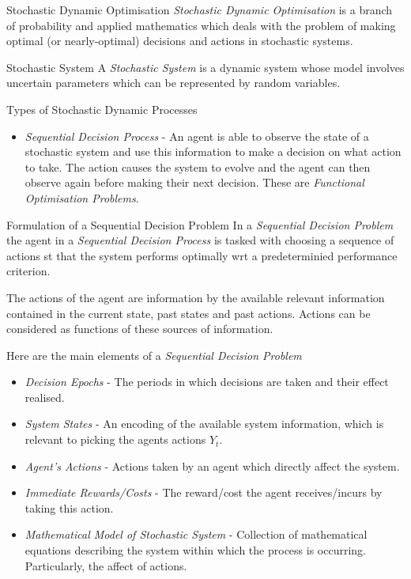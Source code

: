 \documentclass[11pt,a4paper]{article}
\begin{document}
  \begin{definition}{Stochastic Dynamic Optimisation}
    \textit{Stochastic Dynamic Optimisation} is a branch of probability and applied mathematics which deals with the problem of making optimal (or nearly-optimal) decisions and actions in stochastic systems.
  \end{definition}

  \begin{definition}{Stochastic System}
    A \textit{Stochastic System} is a dynamic system whose model involves uncertain parameters which can be represented by random variables.
  \end{definition}

  \begin{definition}{Types of Stochastic Dynamic Processes}
    \begin{itemize}
      \item \textit{Sequential Decision Process} - An agent is able to observe the state of a stochastic system and use this information to make a decision on what action to take. The action causes the system to evolve and the agent can then observe again before making their next decision. These are \textit{Functional Optimisation Problems}.
    \end{itemize}
  \end{definition}

  \begin{proposition}{Formulation of a Sequential Decision Problem}
    In a \textit{Sequential Decision Problem} the agent in a \textit{Sequential Decision Process} is tasked with choosing a sequence of actions st that the system performs optimally wrt a predeterminied performance criterion.
    \par The actions of the agent are information by the available relevant information contained in the current state, past states and past actions. Actions can be considered as functions of these sources of information.
    \par Here are the main elements of a \textit{Sequential Decision Problem}
    \begin{itemize}
      \item \textit{Decision Epochs} - The periods in which decisions are taken and their effect realised.
      \item \textit{System States} - An encoding of the available system information, which is relevant to picking the agents actions $Y_t$.
      \item \textit{Agent's Actions} - Actions taken by an agent which directly affect the system.
      \item \textit{Immediate Rewards/Costs} - The reward/cost the agent receives/incurs by taking this action.
      \item \textit{Mathematical Model of Stochastic System} - Collection of mathematical equations describing the system within which the process is occurring. Particularly, the affect of actions.
    \end{itemize}
  \end{proposition}
\end{document}
